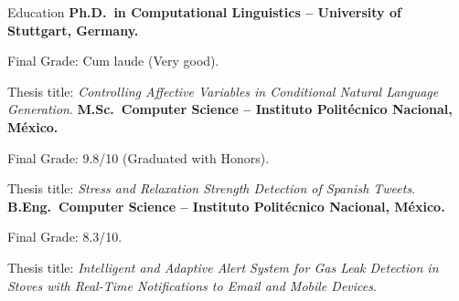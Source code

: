 \begin{rubric}{Education}
\entry*[2021 -- 2025 ]%
	\textbf{Ph.D.~in Computational Linguistics -- University of Stuttgart, Germany.} \par
	Final Grade: Cum laude (Very good).\par
    Thesis title: \textit{Controlling Affective Variables in Conditional Natural Language Generation}.
%
\entry*[2015 -- 2017]%
	\textbf{M.Sc.~Computer Science -- Instituto Politécnico Nacional, México.}\par
    Final Grade: 9.8/10 (Graduated with Honors).\par
	Thesis title: \textit{Stress and Relaxation Strength Detection of Spanish Tweets}.
% 
\entry*[2011 -- 2015]%
	\textbf{B.Eng.~Computer Science -- Instituto Politécnico Nacional, México.}\par
    Final Grade: 8.3/10.\par
	Thesis title: \textit{Intelligent and Adaptive Alert System for Gas Leak Detection in Stoves with Real-Time Notifications to Email and Mobile Devices}.
%
\end{rubric}
